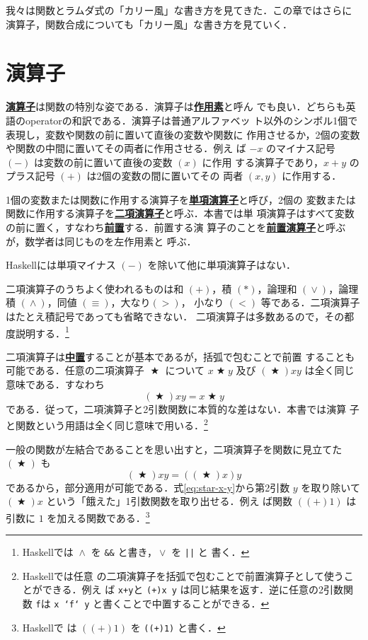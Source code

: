 \documentclass[a5paper,twoside,fleqn,draft]{jsbook}
\newcommand{\programminglanguage}[1]{\textsf{#1}}
\newcommand{\haskell}{\programminglanguage{Haskell}}
\newenvironment{leader}{\begingroup\gt}{\endgroup}
\newcommand{\keyword}[1]{{\underline{\textbf{#1}}}}
\newcommand{\code}[1]{\texttt{#1}}
\DeclareMathOperator{\mBinOp}{\bigstar}
\DeclareMathOperator{\mLogicalAnd}{\wedge}
\DeclareMathOperator{\mLogicalOr}{\vee}
\begin{document}
\begin{leader}
我々は関数とラムダ式の「カリー風」な書き方を見てきた．この章ではさらに
演算子，関数合成についても「カリー風」な書き方を見ていく．
\end{leader}

\section{演算子}

\keyword{演算子}は関数の特別な姿である．演算子は\keyword{作用素}と呼ん
でも良い．どちらも英語のoperatorの和訳である．演算子は普通アルファベッ
ト以外のシンボル1個で表現し，変数や関数の前に置いて直後の変数や関数に
作用させるか，2個の変数や関数の中間に置いてその両者に作用させる．例え
ば $-x$ のマイナス記号 $(-)$ は変数の前に置いて直後の変数 $(x)$ に作用
する演算子であり，$x+y$ のプラス記号 $(+)$ は2個の変数の間に置いてその
両者 $(x,y)$ に作用する．

1個の変数または関数に作用する演算子を\keyword{単項演算子}と呼び，2個の
変数または関数に作用する演算子を\keyword{二項演算子}と呼ぶ．本書では単
項演算子はすべて変数の前に置く，すなわち\keyword{前置}する．前置する演
算子のことを\keyword{前置演算子}と呼ぶが，数学者は同じものを左作用素と
呼ぶ．

\haskell には単項マイナス $(-)$ を除いて他に単項演算子はない．

二項演算子のうちよく使われるものは和 $(+)$，積 $(*)$，論理和
$(\mLogicalOr)$，論理積 $(\mLogicalAnd)$，同値 $(\equiv)$，大なり$(>)$，
小なり $(<)$ 等である．二項演算子はたとえ積記号であっても省略できない．
二項演算子は多数あるので，その都度説明する．\footnote{\haskell では
  $\mLogicalAnd$ を \code{\&\&} と書き，$\mLogicalOr$ を \code{||} と
  書く．}

二項演算子は\keyword{中置}することが基本であるが，括弧で包むことで前置
することも可能である．任意の二項演算子 $\mBinOp$ について $x\mBinOp y$
及び $(\mBinOp)xy$ は全く同じ意味である．すなわち
\begin{equation}
  \left(\mBinOp\right)xy
  =x\mBinOp y
\end{equation}
である．従って，二項演算子と2引数関数に本質的な差はない．本書では演算
子と関数という用語は全く同じ意味で用いる．\footnote{\haskell では任意
の二項演算子を括弧で包むことで前置演算子として使うことができる．例え
ば \code{x+y}と \code{(+)x y} は同じ結果を返す．逆に任意の2引数関数
\code{f}は \code{x `f` y} と書くことで中置することができる．}

一般の関数が左結合であることを思い出すと，二項演算子を関数に見立てた
$(\mBinOp)$ も
\begin{equation}
  \label{eq:star-x-y}
  (\mBinOp)xy
  =((\mBinOp)x)y
\end{equation}
であるから，部分適用が可能である．式\eqref{eq:star-x-y}から第2引数 $y$
を取り除いて $(\mBinOp)x$ という「餓えた」1引数関数を取り出せる．例え
ば関数 $((+)1)$ は引数に $1$ を加える関数である．\footnote{\haskell で
は $((+)1)$ を \code{((+)1)} と書く．}
\end{document}

